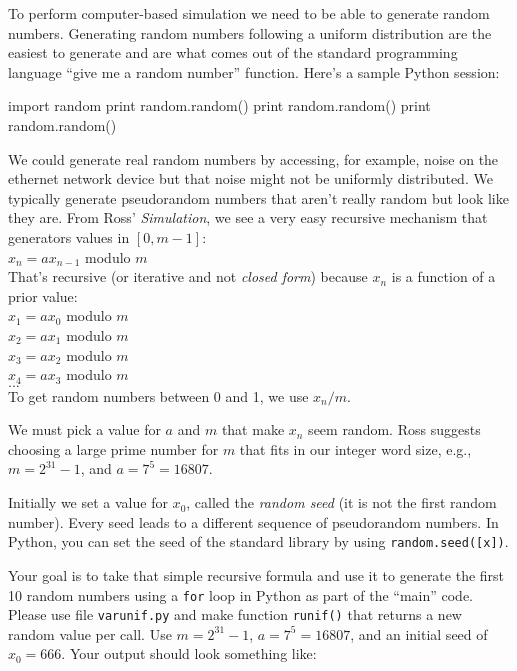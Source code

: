 \begin{fullwidth}

To perform computer-based simulation we need to be able to generate random numbers. Generating random numbers following a uniform distribution are the easiest to generate and are what comes out of the standard programming language ``give me a random number'' function.  Here's a sample Python session:

\begin{pyconsole}
import random
print random.random()
print random.random()
print random.random()
\end{pyconsole}

We could generate real random numbers by accessing, for example, noise on the ethernet network device but that noise might not be uniformly distributed. We typically generate pseudorandom numbers that aren't really random but look like they are. From Ross' {\em Simulation},  we see a very easy recursive mechanism that generators values in $[0,m-1]$:\\

$x_n = a x_{n-1}$ modulo $m$\\

That's recursive (or iterative and not {\em closed form}) because $x_n$ is a function of a prior value: \\

$x_1 = ax_0$ modulo $m$\\
$x_2 = ax_1$ modulo $m$\\
$x_3 = ax_2$ modulo $m$\\
$x_4 = ax_3$ modulo $m$\\
$...$\\

\noindent To get random numbers between 0 and 1, we use $x_n / m$.

We must pick a value for $a$ and $m$ that make $x_n$ seem random. Ross suggests choosing a large prime number for $m$ that fits in our integer word size, e.g., $m = 2^{31} - 1$, and $a = 7^5 = 16807$.

Initially we set a value for $x_0$, called the {\em random seed} (it is not the first random number). Every seed leads to a different sequence of pseudorandom numbers. In Python, you can set the seed of the standard library by using {\tt random.seed([x])}.

Your goal is to take that simple recursive formula and use it to generate the first 10 random numbers using a {\tt for} loop in Python as part of the ``main'' code. Please use file {\tt varunif.py} and make function {\tt runif()} that returns a new random value per call. Use $m = 2^{31} - 1$, $a = 7^5 = 16807$, and an initial seed of $x_0 = 666$.  Your output should look something like:


\end{fullwidth}
